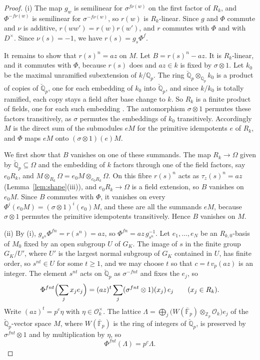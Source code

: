 \documentclass[a4paper,11pt]{amsart}
\theoremstyle{definition}
\theoremstyle{remark}
\numberwithin{equation}{section}
\newcommand{\Q}{\mathbb{Q}}
\newcommand{\Z}{\mathbb{Z}}
\newcommand{\F}{\mathbb{F}}
\newcommand{\Qb}{\breve{\mathbb{Q}}_p}
\newcommand{\OO}{\mathcal{O}}
\begin{document}
\begin{proof}
(i) The map $g_w$ is semilinear for $\sigma^{f\nu(w)}$ on the first factor of $R_k$, and $\Phi^{-f\nu(w)}$ is semilinear for $\sigma^{-f\nu(w)}$, so $r(w)$ is $R_k$-linear. Since $g$ and $\Phi$ commute and $\nu$ is additive, $r(ww')=r(w)r(w')$, and $r$ commutes with $\Phi$ and with $D^\times$. Since $\nu(s)=-1$, we have $r(s)=g_s\Phi^f$.

It remains to show that $r(s)^n=az$ on $M$. Let $B=r(s)^n-az$. It is $R_k$-linear, and it commutes with $\Phi$, because $r(s)$ does and $az\in k$ is fixed by $\sigma\otimes1$. Let $k_0$ be the maximal unramified subextension of $k/\Q_p$. The ring $\Qb\otimes_{\Q_p}k_0$ is a product of copies of $\Qb$, one for each embedding of $k_0$ into $\Qb$, and since $k/k_0$ is totally ramified, each copy stays a field after base change to $k$. So $R_k$ is a finite product of fields, one for each such embedding \cite[Lemma~1.2.1]{Cre25}. The automorphism $\sigma\otimes1$ permutes these factors transitively, as $\sigma$ permutes the embeddings of $k_0$ transitively. Accordingly $M$ is the direct sum of the submodules $eM$ for the primitive idempotents $e$ of $R_k$, and $\Phi$ maps $eM$ onto $(\sigma\otimes1)(e)M$.

We first show that $B$ vanishes on one of these summands. The map $R_k\to\Omega$ given by $\Qb\subseteq\Omega$ and the embedding of $k$ factors through one of the field factors, say $e_0R_k$, and $M\otimes_{R_k}\Omega=e_0M\otimes_{e_0R_k}\Omega$. On this fibre $r(s)^n$ acts as $\tau_z(s)^n=az$ (Lemma~\ref{lem:shape}(iii)), and $e_0R_k\to\Omega$ is a field extension, so $B$ vanishes on $e_0M$. Since $B$ commutes with $\Phi$, it vanishes on every $\Phi^i(e_0M)=(\sigma\otimes1)^i(e_0)M$, and these are all the summands $eM$, because $\sigma\otimes1$ permutes the primitive idempotents transitively. Hence $B$ vanishes on $M$.

(ii) By (i), $g_{s^n}\Phi^{fn}=r(s^n)=az$, so $\Phi^{fn}=az\,g_{s^n}^{-1}$. Let $e_1,\dots,e_N$ be an $R_{k,0}$-basis of $M_0$ fixed by an open subgroup $U$ of $G_K$. The image of $s$ in the finite group $G_K/U'$, where $U'$ is the largest normal subgroup of $G_K$ contained in $U$, has finite order, so $s^{nt}\in U$ for some $t\geq1$, and we may choose $t$ so that $c=t\,v_p(az)$ is an integer. The element $s^{nt}$ acts on $\Qb$ as $\sigma^{-fnt}$ and fixes the $e_j$, so
\[
 \Phi^{fnt}\Bigl(\sum_jx_je_j\Bigr)=(az)^t\sum_j(\sigma^{fnt}\otimes1)(x_j)\,e_j \qquad(x_j\in R_k).
\]
Write $(az)^t=p^c\eta$ with $\eta\in\OO_k^\times$. The lattice $\Lambda=\bigoplus_j\bigl(W(\overline{\F}_p)\otimes_{\Z_p}\OO_k\bigr)e_j$ of the $\Qb$-vector space $M$, where $W(\overline{\F}_p)$ is the ring of integers of $\Qb$, is preserved by $\sigma^{fnt}\otimes1$ and by multiplication by $\eta$, so
\[
 \Phi^{fnt}(\Lambda)=p^c\Lambda.
\]


\end{proof}
\end{document}
